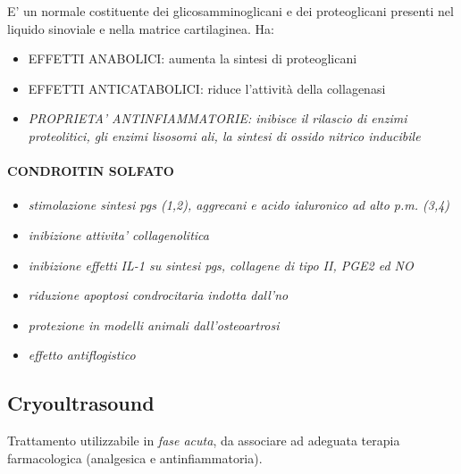 E' un normale costituente dei glicosamminoglicani e dei proteoglicani
presenti nel liquido sinoviale e nella matrice cartilaginea. Ha:

\begin{itemize}
\item
  EFFETTI ANABOLICI: aumenta la sintesi di proteoglicani
\item
  EFFETTI ANTICATABOLICI: riduce l'attività della collagenasi
  \item
    \emph{PROPRIETA' ANTINFIAMMATORIE: inibisce il rilascio di enzimi
    proteolitici, gli enzimi lisosomi ali, la sintesi di ossido nitrico inducibile}
  \end{itemize}



\paragraph{CONDROITIN SOLFATO}



\begin{itemize}
\item
  
  \emph{stimolazione sintesi pgs (1,2), aggrecani e acido ialuronico ad
  alto p.m. (3,4)}
  
\item
  
  \emph{inibizione attivita' collagenolitica}
  
\item
  
  \emph{inibizione effetti IL-1 su sintesi pgs, collagene di tipo II,
  PGE2 ed NO}
  
\item
  
  \emph{riduzione apoptosi condrocitaria indotta dall'no}
  
\item
  
  \emph{protezione in modelli animali dall'osteoartrosi}
  
\item
  
  \emph{effetto antiflogistico}
  
\end{itemize}

\subsection{Cryoultrasound}


Trattamento utilizzabile in \emph{fase acuta}, da associare ad adeguata
terapia farmacologica (analgesica e antinfiammatoria).

